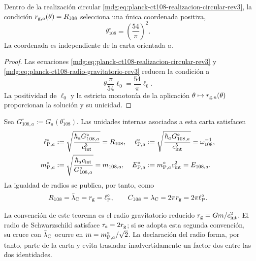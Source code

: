 \begin{proposition}
\label{mdg:prop:selector-circular-planck-ct108-rev3}
Dentro de la realización circular
\eqref{mdg:eq:planck-ct108-realizacion-circular-rev3}, la condición
\(r_{{\rm g},a}(\theta)=R_{108}\) selecciona una única coordenada
positiva,
\begin{equation}
 \boxed{\theta_{108}^{\circ}=\left(\frac{54}{\pi}\right)^2.}
 \label{mdg:eq:theta-circular-planck-ct108-rev3}
\end{equation}
La coordenada es independiente de la carta orientada \(a\).
\end{proposition}

\begin{proof}
Las ecuaciones
\eqref{mdg:eq:planck-ct108-realizacion-circular-rev3} y
\eqref{mdg:eq:planck-ct108-radio-gravitatorio-rev3} reducen la condición a
\[
 \theta\frac{\pi}{54}\ell_0=\frac{54}{\pi}\ell_0.
\]
La positividad de \(\ell_0\) y la estricta monotonía de la aplicación
\(\theta\mapsto r_{{\rm g},a}(\theta)\) proporcionan la solución y su
unicidad.
\end{proof}

Sea \(G_{108,a}^{\circ}:=G_a(\theta_{108}^{\circ})\). Las unidades internas
asociadas a esta carta satisfacen
\begin{align}
 \ell_{{\rm P},a}^{\circ}
 &:=\sqrt{\frac{\hbar_a G_{108,a}^{\circ}}{c_{\rm int}^{3}}}
 =R_{108},
 &
 t_{{\rm P},a}^{\circ}
 &:=\sqrt{\frac{\hbar_a G_{108,a}^{\circ}}{c_{\rm int}^{5}}}
 =\omega_{108}^{-1},
 \label{mdg:eq:planck-ct108-longitud-tiempo-rev3}\\
 m_{{\rm P},a}^{\circ}
 &:=\sqrt{\frac{\hbar_a c_{\rm int}}{G_{108,a}^{\circ}}}
 =m_{108,a},
 &
 E_{{\rm P},a}^{\circ}
 &:=m_{{\rm P},a}^{\circ}c_{\rm int}^{2}=E_{108,a}.
 \label{mdg:eq:planck-ct108-masa-energia-rev3}
\end{align}
La igualdad de radios se publica, por tanto, como
\begin{equation}
 R_{108}=\bar\lambda_{\rm C}=r_{\rm g}=\ell_{\rm P}^{\circ},
 \qquad
 C_{108}=\lambda_{\rm C}=2\pi r_{\rm g}=2\pi\ell_{\rm P}^{\circ}.
 \label{mdg:eq:planck-ct108-tres-lectores-rev3}
\end{equation}

La convención de este teorema es el radio gravitatorio reducido
\(r_{\rm g}=Gm/c_{\rm int}^{2}\). El radio de Schwarzschild satisface
\(r_{\rm s}=2r_{\rm g}\); si se adopta esta segunda convención, su cruce con
\(\bar\lambda_{\rm C}\) ocurre en
\(m=m_{{\rm P},a}^{\circ}/\sqrt2\). La declaración del radio forma, por
tanto, parte de la carta y evita trasladar inadvertidamente un factor dos
entre las dos identidades.

